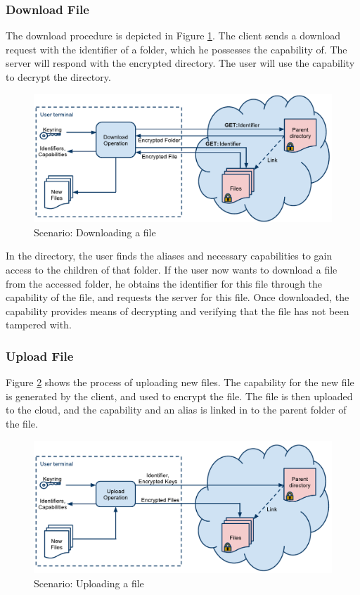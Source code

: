 \documentclass[pdftex,english,10pt,b5paper,twoside]{book}
\begin{document}
\subsubsection{Download File}

The download procedure is depicted in Figure \ref{fig:AS:download}. The client
sends a download request with the identifier of a folder, which he possesses
the capability of. The server will respond with the encrypted directory.
The user will use the capability to decrypt the directory.

\begin{figure}[h!]
    \centering
    \includegraphics[width=\columnwidth]{ArchitectureDownload.pdf}
    \caption{Scenario: Downloading a file}
    \label{fig:AS:download}
\end{figure}

In the directory, the user finds the aliases and necessary capabilities to gain
access to the children of that folder. If the user now wants to download a file
from the accessed folder, he obtains the identifier for this file through the
capability of the file, and requests the server for this file. Once downloaded,
the capability provides means of decrypting and verifying that the file has not
been tampered with.

\subsubsection{Upload File}

Figure \ref{fig:AS:upload} shows the process of uploading new files. The
capability for the new file is generated by the client, and used to encrypt the
file. The file is then uploaded to the cloud, and the capability and an alias
is linked in to the parent folder of the file.

\begin{figure}[h!]
    \centering
    \includegraphics[width=\columnwidth]{ArchitectureUpload.pdf}
    \caption{Scenario: Uploading a file}
    \label{fig:AS:upload}
\end{figure}
\end{document}
